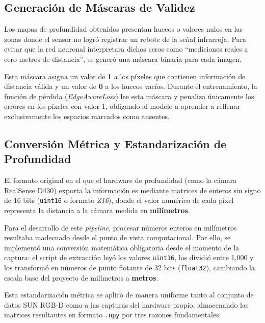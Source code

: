 \documentclass[12pt, a4, twoside, openany]{report}
\begin{document}
\subsection{Generación de Máscaras de Validez}

Los mapas de profundidad obtenidos presentan huecos o valores nulos en las zonas donde el sensor no logró registrar un rebote de la señal infrarroja. Para evitar que la red neuronal interpretara dichos ceros como ``mediciones reales a cero metros de distancia'', se generó una máscara binaria para cada imagen.

Esta máscara asigna un valor de \textbf{1} a los píxeles que contienen información de distancia válida y un valor de \textbf{0} a los huecos vacíos. Durante el entrenamiento, la función de pérdida (\textit{EdgeAwareLoss}) lee esta máscara y penaliza únicamente los errores en los píxeles con valor 1, obligando al modelo a aprender a rellenar exclusivamente los espacios marcados como ausentes.

\subsection{Conversión Métrica y Estandarización de Profundidad}

El formato original en el que el hardware de profundidad (como la cámara RealSense D430) exporta la información es mediante matrices de enteros sin signo de 16 bits (\texttt{uint16} o formato \textit{Z16}), donde el valor numérico de cada píxel representa la distancia a la cámara medida en \textbf{milímetros}.

Para el desarrollo de este \textit{pipeline}, procesar números enteros en milímetros resultaba inadecuado desde el punto de vista computacional. Por ello, se implementó una conversión matemática obligatoria desde el momento de la captura: el script de extracción leyó los valores \texttt{uint16}, los dividió entre 1{,}000 y los transformó en números de punto flotante de 32 bits (\texttt{float32}), cambiando la escala base del proyecto de milímetros a \textbf{metros}.

Esta estandarización métrica se aplicó de manera uniforme tanto al conjunto de datos SUN RGB-D como a las capturas del hardware propio, almacenando las matrices resultantes en formato \texttt{.npy} por tres razones fundamentales:
\end{document}
